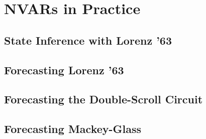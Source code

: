 \chapter{NVARs in Practice}\label{ch:nvar-application}

\section{State Inference with Lorenz '63}

\section{Forecasting Lorenz '63}

\section{Forecasting the Double-Scroll Circuit}

\section{Forecasting Mackey-Glass}
